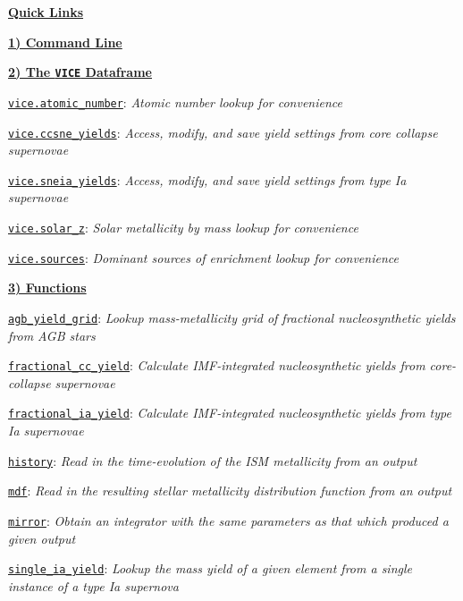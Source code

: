 \documentclass{report}
\begin{document}
\par\noindent
\underline{\textbf{Quick Links}} 
\par\noindent
\hyperlink{sec:cmdline}{\textbf{1) Command Line}}
\par\noindent
\hyperlink{sec:dataframes}{\textbf{2) The \texttt{VICE} Dataframe}}
\par
\hyperlink{df:atomic_number}{\texttt{vice.atomic\_number}}: 
\textit{Atomic number lookup for convenience} 
\par
\hyperlink{df:ccsne_yields}{\texttt{vice.ccsne\_yields}}:
\textit{Access, modify, and save yield settings from core collapse supernovae} 
\par
\hyperlink{df:sneia_yields}{\texttt{vice.sneia\_yields}}: 
\textit{Access, modify, and save yield settings from type Ia supernovae} 
\par
\hyperlink{df:solar_z}{\texttt{vice.solar\_z}}: 
\textit{Solar metallicity by mass lookup for convenience} 
\par
\hyperlink{df:sources}{\texttt{vice.sources}}: 
\textit{Dominant sources of enrichment lookup for convenience} 
\par\noindent
\hyperlink{sec:functions}{\textbf{3) Functions}}
\par
\hyperlink{func:agb_yield_grid}{\texttt{agb\_yield\_grid}}: 
\textit{Lookup mass-metallicity grid of fractional nucleosynthetic yields from 
AGB stars} 
\par
\hyperlink{func:fractional_cc_yield}{\texttt{fractional\_cc\_yield}}: 
\textit{Calculate IMF-integrated nucleosynthetic yields from core-collapse 
supernovae} 
\par
\hyperlink{func:fractional_ia_yield}{\texttt{fractional\_ia\_yield}}: 
\textit{Calculate IMF-integrated nucleosynthetic yields from type Ia 
supernovae} 
\par
\hyperlink{func:history}{\texttt{history}}: 
\textit{Read in the time-evolution of the ISM metallicity from an output} 
\par
\hyperlink{func:mdf}{\texttt{mdf}}: 
\textit{Read in the resulting stellar metallicity distribution function from 
an output} 
\par
\hyperlink{func:mirror}{\texttt{mirror}}: 
\textit{Obtain an integrator with the same parameters as that which produced 
a given output} 
\par
\hyperlink{func:single_ia_yield}{\texttt{single\_ia\_yield}}: 
\textit{Lookup the mass yield of a given element from a single instance of 
a type Ia supernova} 
\par
\end{document}
